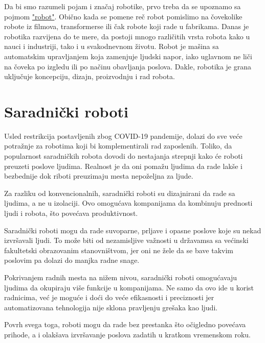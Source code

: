 \documentclass{report}
\begin{document}
Da bi smo razumeli pojam i značaj robotike, prvo treba da se upoznamo sa pojmom \href{https://www.sciencefriday.com/segments/the-origin-of-the-word-robot/}{"robot"}.
Obično kada se pomene reč robot pomislimo na čovekolike robote iz filmova, transformerse ili čak robote koji rade u fabrikama. Danas je robotika razvijena do te mere, da postoji mnogo različitih vrsta robota kako u nauci i industriji, tako i u svakodnevnom životu. Robot je mašina sa automatskim upravljanjem koja zamenjuje ljudski napor, iako uglavnom ne liči na čoveka po izgledu ili po načinu obavljanja poslova. Dakle, robotika je grana uključuje koncepciju, dizajn, proizvodnju i rad robota. \cite{robots in nowdays}




\chapter{Saradnički roboti}

Usled restrikcija postavljenih zbog COVID-19 pandemije, dolazi do sve veće potražnje za robotima koji bi komplementirali rad zaposlenih. Toliko, da popularnost saradničkih robota dovodi do nestajanja strepnji kako će roboti preuzeti poslove ljudima. Realnost je da oni pomažu ljudima da rade lakše i bezbednije dok riboti preuzimaju mesta nepoželjna za ljude.

Za razliku od konvencionalnih, saradnički roboti su dizajnirani da rade sa ljudima, a ne u izolaciji. Ovo omogućava kompanijama da kombinuju prednosti ljudi i robota, što povećava produktivnost. \cite{robotics2022}

Saradnički roboti mogu da rade suvoparne, prljave i opasne poslove koje su nekad izvršavali ljudi. To može biti od nezamisljive važnosti u državamsa sa većinski fakultetski obrazovanim stanovništvom, jer oni ne žele da se bave takvim poslovim pa dolazi do manjka radne snage.

Pokrivanjem radnih mesta na nižem nivou, saradnički roboti omogućavaju ljudima da okupiraju više funkcije u kompanijama. Ne samo da ovo ide u korist radnicima, već je moguće i doći do veće efikasnosti i preciznosti jer automatizovana tehnologija nije sklona pravljenju grešaka kao ljudi.

Povrh svega toga, roboti mogu da rade bez prestanka što očigledno povećava prihode, a i olakšava izvršavanje poslova zadatih u kratkom vremenskom roku. \cite{cobots}
\end{document}
